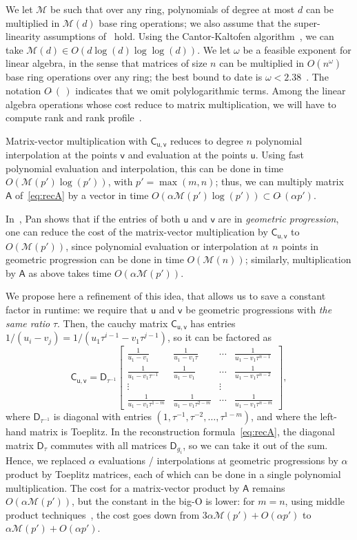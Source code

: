 \documentclass{sig-alternate}
\newcommand{\vu}{\ensuremath{\mathsf{u}}}
\newcommand{\vv}{\ensuremath{\mathsf{v}}}
\newcommand{\mA}{\ensuremath{\mathsf{A}}}
\newcommand{\mC}{\ensuremath{\mathsf{C}}}
\newcommand{\mD}{\ensuremath{\mathsf{D}}}
\newcommand{\M}{\ensuremath{\mathscr{M}}}
\newcommand{\Otilde}[1]{\ensuremath{O\tilde{~}(#1)}} %
\begin{document}
We let $\M$ be such that over any ring, polynomials of degree at most
$d$ can be multiplied in $\M(d)$ base ring operations; we also assume
that the super-linearity assumptions of~\cite[Chapter~8]{GaGe13}
hold. Using the Cantor-Kaltofen algorithm~\cite{CaKa91}, we can take
$\M(d)\in O(d \log(d)\log\log(d))$. We let $\omega$ be a feasible
exponent for linear algebra, in the sense that matrices of size $n$
can be multiplied in $O(n^\omega)$ base ring operations over any ring;
the best bound to date is $\omega < 2.38$~\cite{CoWi90, LeGall14}.
The notation $\Otilde{\,}$ indicates that we omit polylogarithmic
terms. Among the linear algebra operations whose cost reduce to matrix
multiplication, we will have to compute rank and rank
profile~\cite{IbMoHu82}.

Matrix-vector multiplication with $\mC_{\vu,\vv}$ reduces to degree
$n$ polynomial interpolation at the points $\vv$ and evaluation at the
points $\vu$. Using fast polynomial evaluation and interpolation, this
can be done in time $O(\M(p')\log(p'))$, with $p'=\max(m,n)$; thus, we
can multiply matrix $\mA$ of~\eqref{eq:recA} by a vector in time
$O(\alpha \M(p')\log(p'))\subset \Otilde{\alpha p'}$.

In~\cite[Theorem~4.7.3]{Pan01}, Pan shows that if the entries of both
$\vu$ and $\vv$ are in {\em geometric progression}, one can reduce the
cost of the matrix-vector multiplication by $\mC_{\vu,\vv}$ to
$O(\M(p'))$, since polynomial evaluation or interpolation at $n$
points in geometric progression can be done in time $O(\M(n))$;
similarly, multiplication by $\mA$ as above takes time
$O(\alpha\M(p'))$.

We propose here a refinement of this idea, that allows us to
save a constant factor in runtime: we require that $\vu$ and $\vv$ be
geometric progressions with {\em the same ratio} $\tau$. Then, the
cauchy matrix $\mC_{\vu,\vv}$ has entries $1/(u_i -
v_j) = 1/(u_1 \tau^{i-1} - v_1 \tau^{j-1})$, so it can be factored as
$$\mC_{\vu,\vv}=\mD_{\tau^{-1}}
\begin{bmatrix}
\frac 1{u_1 - v_1} & \frac 1{u_1 - v_1 \tau} & \cdots & \frac 1{u_1-v_1 \tau^{n-1}}\\
\frac 1{u_1 - v_1 \tau^{-1}}  & \frac 1{u_1 - v_1} & \cdots & \frac 1{u_1-v_1 \tau^{n-2}}\\
\vdots & & \vdots \\
\frac 1{u_1 - v_1 \tau^{1-m}}  & \frac 1{u_1 - v_1 \tau^{2-m}} & \cdots & \frac 1{u_1-v_1 \tau^{n-m}}
\end{bmatrix},$$
where $\mD_{\tau^{-1}}$ is diagonal with entries
$(1,\tau^{-1},\tau^{-2},\dots,\tau^{1-m})$, and where the left-hand matrix
is Toeplitz. In the reconstruction formula~\eqref{eq:recA}, the
diagonal matrix $\mD_\tau$ commutes with all matrices $\mD_{g_i}$, so
we can take it out of the sum. Hence, we replaced $\alpha$ evaluations
/ interpolations at geometric progressions by $\alpha$ product by
Toeplitz matrices, each of which can be done in a single polynomial
multiplication. The cost for a matrix-vector product by $\mA$ remains
$O(\alpha \M(p'))$, but the constant in the big-O is lower: for $m=n$,
using middle product techniques~\cite{HaQuZi04,BoLeSc03,BoSc05}, the
cost goes down from $3\alpha \M(p') +O(\alpha p')$ to $\alpha \M(p')
+O(\alpha p')$. 
\end{document}
